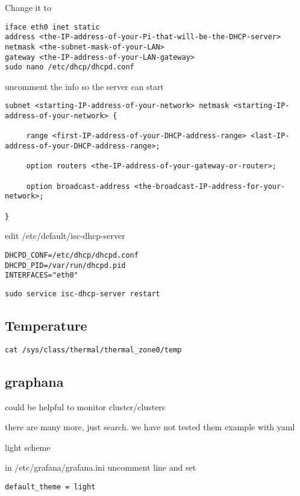 Change it to 

\begin{lstlisting}
iface eth0 inet static
address <the-IP-address-of-your-Pi-that-will-be-the-DHCP-server>
netmask <the-subnet-mask-of-your-LAN>
gateway <the-IP-address-of-your-LAN-gateway>
sudo nano /etc/dhcp/dhcpd.conf
\end{lstlisting}

uncomment the info so the server can start

\begin{lstlisting}
subnet <starting-IP-address-of-your-network> netmask <starting-IP-address-of-your-network> {

     range <first-IP-address-of-your-DHCP-address-range> <last-IP-address-of-your-DHCP-address-range>;

     option routers <the-IP-address-of-your-gateway-or-router>;

     option broadcast-address <the-broadcast-IP-address-for-your-network>;

}
\end{lstlisting}

edit /etc/default/isc-dhcp-server

\begin{lstlisting}
DHCPD_CONF=/etc/dhcp/dhcpd.conf
DHCPD_PID=/var/run/dhcpd.pid
INTERFACES="eth0"
\end{lstlisting}

\begin{lstlisting}
sudo service isc-dhcp-server restart
\end{lstlisting}

\subsection{Temperature}

\begin{lstlisting}
cat /sys/class/thermal/thermal_zone0/temp
\end{lstlisting}

\subsection{graphana}

could be helpful to monitor cluster/clusters




there are many more, just search. we have not tested them
example with yaml


light scheme

in /etc/grafana/grafana.ini uncomment line and set 

\begin{lstlisting}
default_theme = light 
\end{lstlisting}